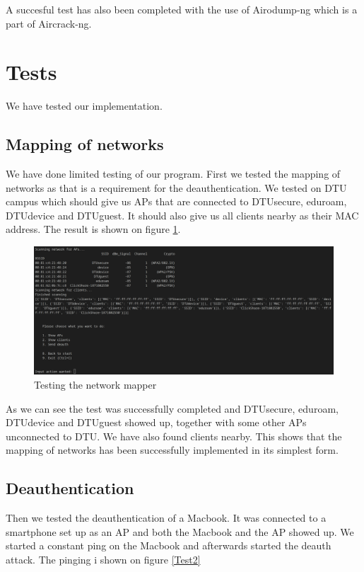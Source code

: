 A succesful test has also been completed with the use of Airodump-ng which is a part of Aircrack-ng.
\newpage
\section{Tests}
We have tested our implementation.
\subsection{Mapping of networks}
We have done limited testing of our program. First we tested the mapping of networks as that is a requirement for the deauthentication. We tested on DTU campus which should give us APs that are connected to DTUsecure, eduroam, DTUdevice and DTUguest. It should also give us all clients nearby as their MAC address. The result is shown on figure \ref{test1}.

\begin{figure}[!htbp]
    \centering
    \includegraphics[width=\textwidth]{Latex-Files/Billeder/Tests/scan_network.png}
    \caption{Testing the network mapper}
    \label{test1}
\end{figure}

As we can see the test was successfully completed and DTUsecure, eduroam, DTUdevice and DTUguest showed up, together with some other APs unconnected to DTU. We have also found clients nearby. This shows that the mapping of networks has been successfully implemented in its simplest form. 

\subsection{Deauthentication}

Then we tested the deauthentication of a Macbook. It was connected to a smartphone set up as an AP and both the Macbook and the AP showed up. We started a constant ping on the Macbook and afterwards started the deauth attack. The pinging i shown on figure \ref{Test2}

